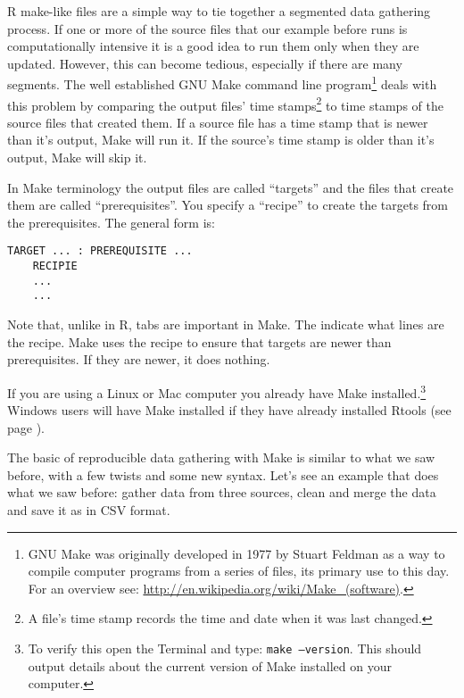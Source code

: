 R make-like files are a simple way to tie together a segmented data gathering process. If one or more of the source files that our example before runs is computationally intensive it is a good idea to run them only when they are updated. However, this can become tedious, especially if there are many segments. The well established GNU Make command line program\footnote{GNU Make was originally developed in 1977 by Stuart Feldman as a way to compile computer programs from a series of files, its primary use to this day. For an overview see: \url{http://en.wikipedia.org/wiki/Make_(software)}.} deals with this problem by comparing the output files' time stamps\footnote{A file's time stamp records the time and date when it was last changed.} to time stamps of the source files that created them. If a source file has a time stamp that is newer than it's output, Make will run it. If the source's time stamp is older than it's output, Make will skip it.

In Make terminology the output files are called ``targets'' and the files that create them are called ``prerequisites''. You specify a ``recipe'' to create the targets from the prerequisites. The general form is:

\begin{knitrout}
    \color{fgcolor}
    \begin{kframe}
        \begin{verbatim}
TARGET ... : PREREQUISITE ...
    RECIPIE
    ... 
    ...
            \end{verbatim}
        \end{kframe}
\end{knitrout}

Note that, unlike in R, tabs are important in Make. The indicate what lines are the recipe. Make uses the recipe to ensure that targets are newer than prerequisites. If they are newer, it does nothing.

If you are using a Linux or Mac computer you already have Make installed.\footnote{To verify this open the Terminal and type: \texttt{make --version}. This should output details about the current version of Make installed on your computer.} Windows users will have Make installed if they have already installed Rtools (see page \pageref{RtoolsDownload}).

The basic of reproducible data gathering with Make is similar to what we saw before, with a few twists and some new syntax. Let's see an example that does what we saw before: gather data from three sources, clean and merge the data and save it as in CSV format. 

